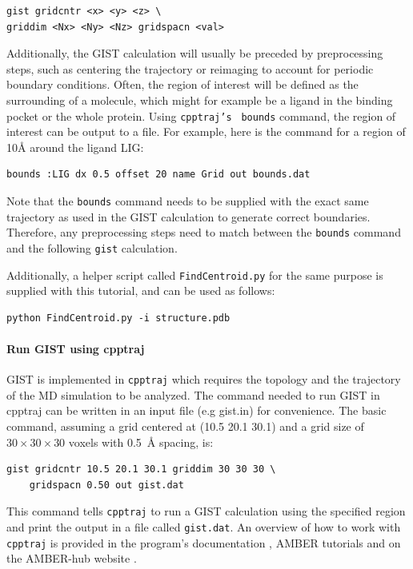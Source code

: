 \documentclass[9pt,tutorial]{livecoms}
\newcommand{\software}{\texttt}
\newcommand\inlinecode{\texttt}
\begin{document}
\begin{lstlisting}[style=cpptraj]
gist gridcntr <x> <y> <z> \
griddim <Nx> <Ny> <Nz> gridspacn <val>
\end{lstlisting}
Additionally, the GIST calculation will usually be preceded by preprocessing steps, such as centering the trajectory or reimaging to account for periodic boundary conditions.
Often, the region of interest will be defined as the surrounding of a molecule, which might for example be a ligand in the binding pocket or the whole protein. Using \inlinecode{cpptraj's } \inlinecode{bounds} command, the region of interest can be output to a file. For example, here is the command for a region of 10\AA{} around the ligand LIG:
\begin{lstlisting}[style=cpptraj]
bounds :LIG dx 0.5 offset 20 name Grid out bounds.dat
\end{lstlisting}
Note that the \inlinecode{bounds} command needs to be supplied with the exact same trajectory as used in the GIST calculation to generate correct boundaries. Therefore, any preprocessing steps need to match between the \inlinecode{bounds} command and the following \inlinecode{gist} calculation.

Additionally, a helper script called \inlinecode{FindCentroid.py} for the same purpose is supplied with this tutorial, and can be used as follows:

\begin{lstlisting}[style=bash]
python FindCentroid.py -i structure.pdb
\end{lstlisting}

\paragraph{Run GIST using cpptraj}
GIST is implemented in \software{cpptraj} which requires the topology and the trajectory of the MD simulation to be analyzed.
The command needed to run GIST in cpptraj can be written in an input file (e.g gist.in) for convenience. The basic command, assuming a grid centered at (10.5 20.1 30.1) and a grid size of $30\times30\times30$ voxels with \SI{0.5}{\angstrom} spacing, is:

\begin{lstlisting}[style=cpptraj]
gist gridcntr 10.5 20.1 30.1 griddim 30 30 30 \
	gridspacn 0.50 out gist.dat
\end{lstlisting}

This command tells \software{cpptraj} to run a GIST calculation using the specified region and print the output in a file called \inlinecode{gist.dat}.  An overview of how to work with \software{cpptraj} is provided in the program's documentation \cite{cpptraj_doc}, AMBER tutorials \cite{amber_tut_cpptraj} and on the AMBER-hub website \cite{amber_hub}.
\end{document}
